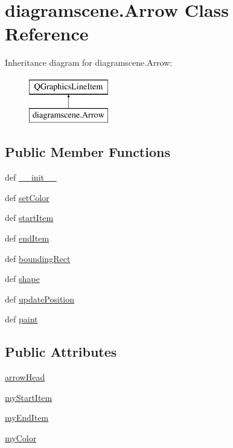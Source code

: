 \hypertarget{classdiagramscene_1_1Arrow}{}\section{diagramscene.\+Arrow Class Reference}
\label{classdiagramscene_1_1Arrow}
Inheritance diagram for diagramscene.\+Arrow\+:\begin{figure}[H]
\begin{center}
\leavevmode
\includegraphics[height=2.000000cm]{classdiagramscene_1_1Arrow}
\end{center}
\end{figure}
\subsection*{Public Member Functions}
\begin{DoxyCompactItemize}
\item 
def \hyperlink{classdiagramscene_1_1Arrow_a5bd79c6de6cc79ef25d39ce423f01321}{\+\_\+\+\_\+init\+\_\+\+\_\+}
\item 
def \hyperlink{classdiagramscene_1_1Arrow_af335d18bf1975b504a3192ab94b2a192}{set\+Color}
\item 
def \hyperlink{classdiagramscene_1_1Arrow_a3679780b8ba188fa05ec19d03ac7e8f0}{start\+Item}
\item 
def \hyperlink{classdiagramscene_1_1Arrow_a31f55991d7f630b187824d6f6f139abb}{end\+Item}
\item 
def \hyperlink{classdiagramscene_1_1Arrow_ae9dfc57563f95747c1479541d16b0b38}{bounding\+Rect}
\item 
def \hyperlink{classdiagramscene_1_1Arrow_a19faca2a941d010dfa9127768dcc2672}{shape}
\item 
def \hyperlink{classdiagramscene_1_1Arrow_afcd660edb7d92aa7d4278205d59a4a91}{update\+Position}
\item 
def \hyperlink{classdiagramscene_1_1Arrow_a502372526a4feaffc9c297f51fe1b27e}{paint}
\end{DoxyCompactItemize}
\subsection*{Public Attributes}
\begin{DoxyCompactItemize}
\item 
\hyperlink{classdiagramscene_1_1Arrow_a2f8c649e8b71692710c0d04e2cbf6e49}{arrow\+Head}
\item 
\hyperlink{classdiagramscene_1_1Arrow_aa481b83d8dc8d6e67847f558447ac4f2}{my\+Start\+Item}
\item 
\hyperlink{classdiagramscene_1_1Arrow_ad31fdc2cc92b3b6a7ccd46fc668f8327}{my\+End\+Item}
\item 
\hyperlink{classdiagramscene_1_1Arrow_ab0b8051e53c0451e51cebcf4a8d85226}{my\+Color}
\end{DoxyCompactItemize}


